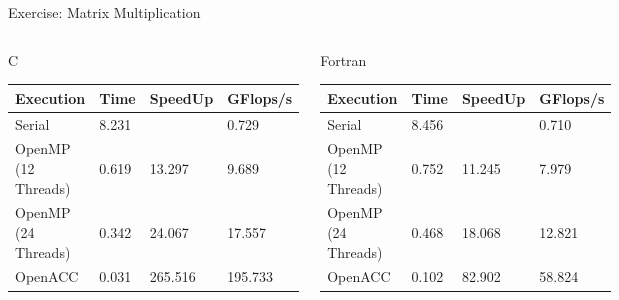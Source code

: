 \documentclass[10pt,t]{beamer}
\begin{document}
\begin{frame}{ Exercise: Matrix Multiplication}
  \begin{columns}
    \begin{exampleblock}{C}
      \begin{tabular}{|b|b|b|b|}
        \hline
        \rowcolor{lublue}Execution & Time & SpeedUp & GFlops/s \\
        \hline
        Serial & 8.231 &  & 0.729 \\
        OpenMP (12 Threads) & 0.619 & 13.297 & 9.689 \\
        OpenMP (24 Threads) & 0.342 & 24.067 & 17.557 \\
        OpenACC & 0.031 & 265.516 & 195.733 \\
        \hline
      \end{tabular}
    \end{exampleblock}
    \begin{exampleblock}{Fortran}
      \begin{tabular}{|b|b|b|b|}
        \hline
        \rowcolor{lublue}Execution & Time & SpeedUp & GFlops/s \\
        \hline
        Serial & 8.456 & & 0.710 \\
        OpenMP (12 Threads) & 0.752 & 11.245 & 7.979 \\
        OpenMP (24 Threads) & 0.468 & 18.068  & 12.821 \\
        OpenACC & 0.102 & 82.902 & 58.824 \\
        \hline
      \end{tabular}
    \end{exampleblock}
  \end{columns}
%      
%      
\end{frame}
\end{document}
